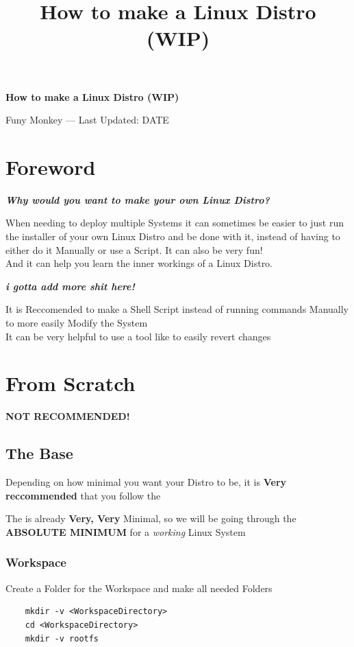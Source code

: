 \documentclass{article}
\title{How to make a Linux Distro (WIP)}
\renewcommand{\maketitle}{
	\begin{center}
		{\huge\bfseries
		How to make a Linux Distro (WIP)}
		\vspace{.25em}

		Funy Monkey --- Last Updated: DATE 
	\end{center}
}
\begin{document}
\maketitle
\tableofcontents

\section{Foreword}
	\textit{\textbf{Why would you want to make your own Linux Distro?}}

	When needing to deploy multiple Systems it can sometimes be easier to just run the installer of your own Linux Distro and be done with it, instead of having to either do it Manually or use a Script. It can also be very fun!
	\\And it can help you learn the inner workings of a Linux Distro.

	\textit{\textbf{i gotta add more shit here!}}

	It is Reccomended to make a Shell Script instead of running commands Manually to more easily Modify the System
	\\
	It can be very helpful to use a tool like  to easily revert changes

\section{From Scratch}
\label{Scratch}
\textbf{NOT RECOMMENDED!}
\subsection{The Base}
	\label{ScratchBase}
	Depending on how minimal you want your Distro to be, it is \textbf{Very reccommended} that you follow the 

	The  is already \textbf{Very, Very} Minimal, so we will be going through the \textbf{ABSOLUTE MINIMUM} for a \textit{working} Linux System 
		\subsubsection{Workspace}
			Create a Folder for the Workspace and make all needed Folders
			
			\begin{lstlisting}
	mkdir -v <WorkspaceDirectory>
	cd <WorkspaceDirectory>
	mkdir -v rootfs
			\end{lstlisting}
\end{document}
